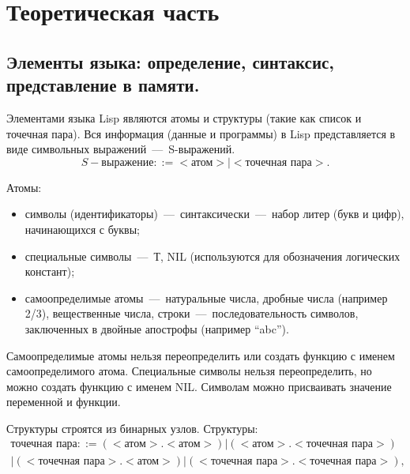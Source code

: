 \setcounter{page}{3}
\chapter{Теоретическая часть}
\section{Элементы языка: определение, синтаксис, представление в памяти.}
Элементами языка Lisp являются атомы и структуры (такие как список и точечная пара). Вся информация (данные и программы) в Lisp представляется в виде символьных выражений~---~S-выражений. 
\begin{equation}
	S-\text{выражение} ::= <\text{атом}> | <\text{точечная пара}>.
\end{equation}

Атомы:
\begin{itemize}
	\item символы (идентификаторы)~---~синтаксически~---~набор литер (букв и цифр), начинающихся с буквы;
	\item специальные символы~---~Т, NIL (используются для обозначения логических констант);
	\item самоопределимые атомы~---~натуральные числа, дробные числа (например 2/3), вещественные числа, строки~---~последовательность символов, заключенных в двойные апострофы (например “abc”).
\end{itemize}

%
%
 
Самоопределимые атомы нельзя переопределить или создать функцию с именем самоопределимого атома. Специальные символы нельзя переопределить, но можно создать функцию с именем NIL. Символам можно присваивать значение переменной и функции.

Структуры строятся из бинарных узлов.
Структуры:
\begin{eqnarray}
	\text{точечная пара} ::= (<\text{атом}>.<\text{атом}>) | (<\text{атом}>.<\text{точечная пара}>)\nonumber\\ |
(<\text{точечная пара}>.<\text{атом}>) | (<\text{точечная пара}>.<\text{точечная пара}>),
\end{eqnarray}

